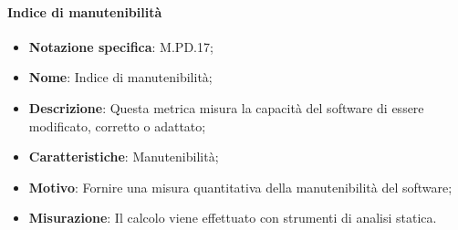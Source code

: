 \paragraph*{Indice di manutenibilità}
\begin{itemize}
    \item \textbf{Notazione specifica}: M.PD.17;
    \item \textbf{Nome}: Indice di manutenibilità;
    \item \textbf{Descrizione}: Questa metrica misura la capacità del software di essere modificato, corretto o adattato;
    \item \textbf{Caratteristiche}: Manutenibilità;
    \item \textbf{Motivo}: Fornire una misura quantitativa della manutenibilità del software;
    \item \textbf{Misurazione}: Il calcolo viene effettuato con strumenti di analisi statica.
\end{itemize}
